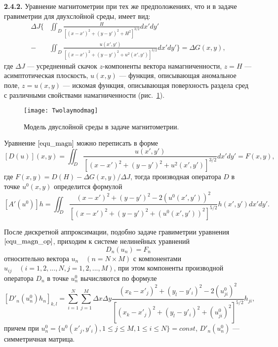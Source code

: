{\bfseries 2.4.2.} 
Уравнение магнитометрии при тех же предположениях, что и в задаче гравиметрии для двухслойной среды, имеет вид:
\begin{equation}\label{equ_magn}\begin{aligned}
\Delta J  \bigg\{&\iint_{D} \frac{H}{[(x-x')^2+(y-y')^2+H^2]^{3/2}}dx'dy' \\
- &\iint_{D} \frac{u(x',y')}{[(x-x')^2+(y-y')^2+u^2(x',y')]^{3/2}}dx'dy' \bigg\}=\Delta G(x,y),
\end{aligned} \end{equation}
где $\Delta J$ --- усредненный скачок $z$-компоненты вектора намагниченности, $z=H$ --- асимптотическая плоскость, $u(x,y)$ --- функция, описывающая аномальное поле, $z=u(x,y)$ --- искомая функция, описывающая поверхность раздела сред с различными свойствами намагниченности (рис.~\ref{fig:twolayermag}). 
\begin{figure}
	\centering
	\texttt{[image: Twolaymodmag]}
	\caption{Модель двуслойной среды в задаче магнитометрии.}
	\label{fig:twolayermag}
\end{figure}
Уравнение $\eqref{equ_magn}$ можно переписать в форме
\begin{equation}\label{equ_magn_op}
[D(u)](x,y)= \iint_{D} \frac{u(x',y')}{[(x-x')^2+(y-y')^2+u^2(x',y')]^{3/2}}dx'dy'=F(x,y),
\end{equation}
где $F(x,y)=D(H)-\Delta G(x,y)/\Delta J$, тогда производная оператора $D$ в точке $u^0(x,y)$ определится формулой
$$ [A'(u^0)]h=\iint_{D} \frac{(x-x')^2+(y-y')^2-2(u^0(x',y'))^2}{[(x-x')^2+(y-y')^2+(u^0(x',y'))^2]^{5/2}}h(x',y')dx'dy'. $$

После дискретной аппроксимации, подобно задаче гравиметрии уравнения $\eqref{equ_magn_op}$, приходим к системе нелинейных уравнений
\begin{equation}\label{equ_snle_mag}
D_n(u_n)=F_n
\end{equation}
относительно вектора $u_n \quad (n=N\times M)$ с компонентами $u_{ij}\quad (i=1,2,...,N, j=1,2,...,M)$, при этом компоненты производной оператора $D_n$ в точке $u_{n}^{0}$ вычисляются по формуле
\begin{equation}\label{deriv_op_mag}
[D'_n(u_{n}^{0})h_n]_{k,l}=\sum\limits_{i=1}^{N}\sum\limits_{j=1}^{M}
\Delta x\Delta y\frac{(x_k-x'_j)^2+(y_l-y'_i)^2-2(u_{ji}^0)^2}{[(x_k-x'_j)^2+(y_l-y'_i)^2+(u_{ji}^0)^2]^{5/2}}h_{ji}, 
\end{equation}
причем при $u_{n}^{0}=\{u^0(x'_j, y'_i), 1\le j\le M, 1\le i\le N\}=const$, $D'_n(u_n^0)$ --- симметричная матрица.

